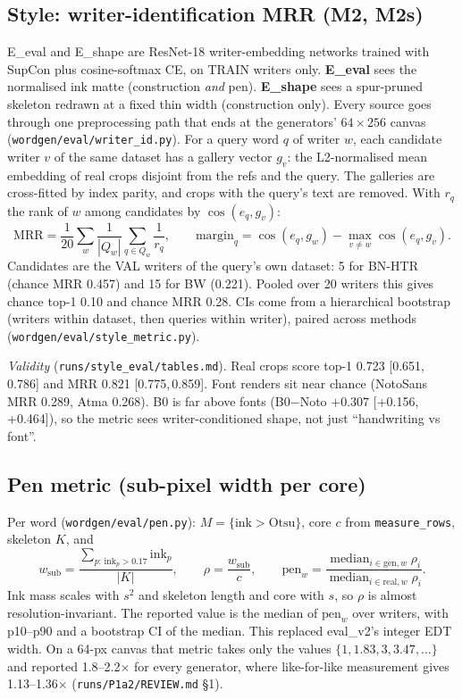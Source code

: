 \documentclass[10.5pt,a4paper]{article}
\newcommand{\fp}[1]{\nolinkurl{#1}}
\newcommand{\ci}[2]{{\footnotesize[#1,\,#2]}}
\begin{document}
\subsection{Style: writer-identification MRR (M2, M2s)}
E\_eval and E\_shape are ResNet-18 writer-embedding networks trained with SupCon plus cosine-softmax CE, on TRAIN writers
only. \textbf{E\_eval} sees the normalised ink matte (construction \emph{and} pen). \textbf{E\_shape} sees a spur-pruned
skeleton redrawn at a fixed thin width (construction only). Every source goes through one preprocessing path that ends at
the generators' $64\times256$ canvas (\fp{wordgen/eval/writer_id.py}). For a query word $q$ of writer $w$, each candidate
writer $v$ of the same dataset has a gallery vector $g_v$: the L2-normalised mean embedding of real crops disjoint from
the refs and the query. The galleries are cross-fitted by index parity, and crops with the query's text are removed. With
$r_q$ the rank of $w$ among candidates by $\cos(e_q,g_v)$:
\begin{equation}
\mathrm{MRR}=\frac{1}{20}\sum_w\frac{1}{|Q_w|}\sum_{q\in Q_w}\frac{1}{r_q},\qquad
\mathrm{margin}_q=\cos(e_q,g_w)-\max_{v\ne w}\cos(e_q,g_v).
\end{equation}
Candidates are the VAL writers of the query's own dataset: 5 for BN-HTR (chance MRR 0.457) and 15 for BW (0.221). Pooled
over 20 writers this gives chance top-1 0.10 and chance MRR 0.28. CIs come from a hierarchical bootstrap (writers within
dataset, then queries within writer), paired across methods (\fp{wordgen/eval/style_metric.py}).

\emph{Validity} (\fp{runs/style_eval/tables.md}). Real crops score top-1 0.723 \ci{0.651}{0.786} and MRR 0.821
\ci{0.775}{0.859}. Font renders sit near chance (NotoSans MRR 0.289, Atma 0.268). B0 is far above fonts (B0$-$Noto
$+0.307$ \ci{+0.156}{+0.464}), so the metric sees writer-conditioned shape, not just ``handwriting vs font''.

\subsection{Pen metric (sub-pixel width per core)}
Per word (\fp{wordgen/eval/pen.py}): $M=\{\text{ink}>\mathrm{Otsu}\}$, core $c$ from \texttt{measure\_rows}, skeleton $K$, and
\begin{equation}
w_{\mathrm{sub}}=\frac{\sum_{p:\,\mathrm{ink}_p>0.17}\mathrm{ink}_p}{|K|},\qquad \rho=\frac{w_{\mathrm{sub}}}{c},\qquad
\mathrm{pen}_w=\frac{\operatorname{median}_{i\in\mathrm{gen},w}\rho_i}{\operatorname{median}_{i\in\mathrm{real},w}\rho_i}.
\end{equation}
Ink mass scales with $s^2$ and skeleton length and core with $s$, so $\rho$ is almost resolution-invariant. The reported
value is the median of $\mathrm{pen}_w$ over writers, with p10--p90 and a bootstrap CI of the median. This replaced
eval\_v2's integer EDT width. On a 64-px canvas that metric takes only the values $\{1, 1.83, 3, 3.47,\dots\}$ and
reported 1.8--2.2$\times$ for every generator, where like-for-like measurement gives 1.13--1.36$\times$
(\fp{runs/P1a2/REVIEW.md} \S1).
\end{document}
